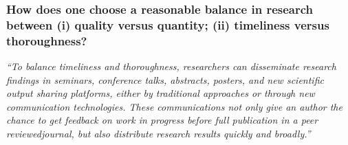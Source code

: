 \documentclass[12pt]{beamer}
\newcommand\ans[1]{{\it ``#1''}}
\newcommand\gap{\vspace{5mm}}
\begin{document}
\begin{frame} %
\frametitle{ How does one choose a reasonable balance in research between (i) quality versus quantity; (ii) timeliness versus thoroughness?}




\ans{To balance timeliness and thoroughness, researchers can disseminate  research  findings  in  seminars,  conference  talks,  abstracts,  posters,  and new scientific output sharing platforms,  either by traditional approaches or through new communication technologies.  These communications not only give an author the chance to get feedback on work in progress before full publication in a peer reviewedjournal, but also distribute research results quickly and broadly.}

\end{frame}
\end{document}

